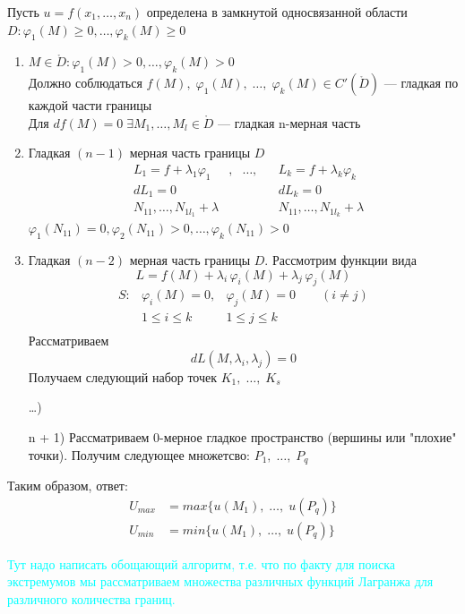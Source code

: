 \begin{Note}
    Пусть $u = f(x_1, \dots, x_n)$ определена в замкнутой односвязанной области $D : \varphi_1(M) \geqslant 0, \dots, \varphi_k(M) \geqslant 0$
    \begin{enumerate}
        \item $M \in \mathring{D}: \varphi_1(M) > 0, \dots, \varphi_k(M) > 0$\\
        Должно соблюдаться $f(M),\; \varphi_1(M),\; \dots,\; \varphi_k(M) \in C'(\mathring{D})$ --- гладкая по каждой части границы\\
        Для $df(M) = 0 \; \exists M_1, \dots, M_l \in \mathring{D}$ --- гладкая n-мерная часть
        
        \item Гладкая $(n-1)$ мерная часть границы $D$
        \begin{align*}
            &L_1 = f + \lambda_1\varphi_1&, &\dots,& &L_k = f + \lambda_k\varphi_k\\
            &dL_1 = 0& && & dL_k = 0\\
            &N_{1 1}, \dots, N_{1 l_1} + \lambda& && &N_{1 1}, \dots, N_{1 l_k} + \lambda
        \end{align*}
        $\varphi_1(N_{1 1}) = 0, \varphi_2(N_{1 1}) > 0, \dots, \varphi_k(N_{1 1}) > 0$
            
        \item Гладкая $(n-2)$ мерная часть границы $D$. Рассмотрим функции вида
        \[
            L = f(M) + \lambda_i\,\varphi_i(M) + \lambda_j\,\varphi_j(M)
        \]
        \begin{align*}
            S: &\varphi_i(M) = 0, &\varphi_j(M) = 0 \qquad (i \neq j)\\ 
            &1 \leqslant i \leqslant k  &1 \leqslant j \leqslant k\\
        \end{align*}
        Рассматриваем
        \[
            dL(M, \lambda_i, \lambda_j) = 0
        \]
        Получаем следующий набор точек $K_1,\; \dots,\; K_s$
        
        \item [\dots)]
        
        \item [n + 1)] Рассматриваем 0-мерное гладкое пространство (вершины или "плохие" точки). Получим следующее множетсво: $P_1,\; \dots,\; P_q$
    \end{enumerate}
    Таким образом, ответ:
    \begin{align*}
        U_{max} &= max\{u(M_1), \; \dots, \; u(P_q)\}\\
        U_{min} &= min\{u(M_1), \; \dots, \; u(P_q)\}
    \end{align*}
\end{Note}
\textcolor{cyan}{Тут надо написать обощающий алгоритм, т.е. что по факту для поиска экстремумов мы рассматриваем множества различных функций Лагранжа для различного количества границ.}